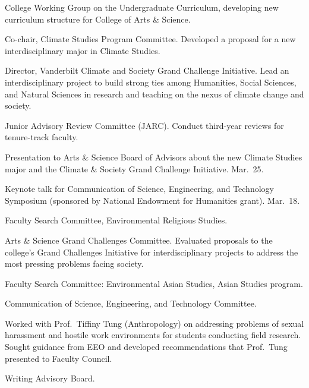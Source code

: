 \item[2022--present] College Working Group on the Undergraduate Curriculum,
  developing new curriculum structure for College of Arts \& Science.
\item[2021--present] Co-chair, Climate Studies Program Committee.
  Developed a proposal for a new interdisciplinary major in Climate Studies.
\item[2020--present] Director, Vanderbilt Climate and Society Grand Challenge
  Initiative. Lead an interdisciplinary project to build strong ties among
  Humanities, Social Sciences, and Natural Sciences in research and teaching on
  the nexus of climate change and society.
\item[2020--present] Junior Advisory Review Committee (JARC).
  Conduct third-year reviews for tenure-track faculty.
\item[2022] Presentation to Arts \& Science Board of Advisors about the new
  Climate Studies major and the Climate \& Society Grand Challenge Initiative.
  Mar.~25.
\item[2022] Keynote talk for Communication of Science, Engineering, and
  Technology Symposium (sponsored by National Endowment for Humanities grant).
  Mar.~18.
\item[2021--2022] Faculty Search Committee, Environmental Religious Studies.
\item[2019--2020] Arts \& Science Grand Challenges Committee.
  Evaluated proposals to the college's Grand Challenges Initiative for
  interdisciplinary projects to address the most pressing problems facing
  society.
\item[2019--2020] Faculty Search Committee: Environmental Asian Studies, Asian Studies program.
\item[2003--2018] Communication of Science, Engineering, and Technology Committee.
\item[2014--2015] Worked with Prof.\ Tiffiny Tung (Anthropology) on addressing problems of sexual harassment and hostile work environments for students conducting field research. Sought guidance from EEO and developed recommendations that Prof.\ Tung presented to Faculty Council.
\item[2004--2009] Writing Advisory Board.
